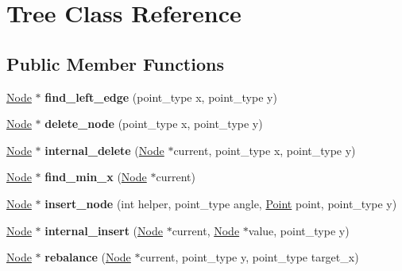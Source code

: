 \hypertarget{class_tree}{}\section{Tree Class Reference}
\label{class_tree}
\subsection*{Public Member Functions}
\begin{DoxyCompactItemize}
\item 
\mbox{\label{class_tree_ab0ffd19812237f340b5d2510a6adb480}} 
\mbox{\hyperlink{class_node}{Node}} $\ast$ {\bfseries find\+\_\+left\+\_\+edge} (point\+\_\+type x, point\+\_\+type y)
\item 
\mbox{\label{class_tree_a1d750a0efb7cee896312ad9ec686ace0}} 
\mbox{\hyperlink{class_node}{Node}} $\ast$ {\bfseries delete\+\_\+node} (point\+\_\+type x, point\+\_\+type y)
\item 
\mbox{\label{class_tree_a284e1beb220d3975c608341a33153299}} 
\mbox{\hyperlink{class_node}{Node}} $\ast$ {\bfseries internal\+\_\+delete} (\mbox{\hyperlink{class_node}{Node}} $\ast$current, point\+\_\+type x, point\+\_\+type y)
\item 
\mbox{\label{class_tree_a65ee58326e83258a71f2965819ab1841}} 
\mbox{\hyperlink{class_node}{Node}} $\ast$ {\bfseries find\+\_\+min\+\_\+x} (\mbox{\hyperlink{class_node}{Node}} $\ast$current)
\item 
\mbox{\label{class_tree_a5bb000b78f8773358d666ce92756b168}} 
\mbox{\hyperlink{class_node}{Node}} $\ast$ {\bfseries insert\+\_\+node} (int helper, point\+\_\+type angle, \mbox{\hyperlink{class_point}{Point}} point, point\+\_\+type y)
\item 
\mbox{\label{class_tree_aeac9d24af31fadf0a7949e3b99b6ec1f}} 
\mbox{\hyperlink{class_node}{Node}} $\ast$ {\bfseries internal\+\_\+insert} (\mbox{\hyperlink{class_node}{Node}} $\ast$current, \mbox{\hyperlink{class_node}{Node}} $\ast$value, point\+\_\+type y)
\item 
\mbox{\label{class_tree_acb6c7889fafe206780bf54364e7f8f97}} 
\mbox{\hyperlink{class_node}{Node}} $\ast$ {\bfseries rebalance} (\mbox{\hyperlink{class_node}{Node}} $\ast$current, point\+\_\+type y, point\+\_\+type target\+\_\+x)

\end{DoxyCompactItemize}
